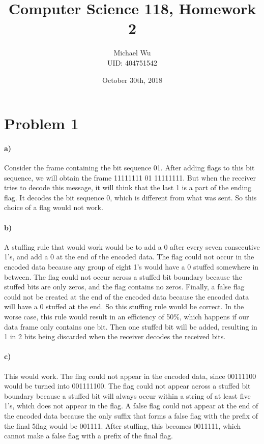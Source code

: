 \documentclass[12pt]{article}
\begin{document}
\title{Computer Science 118, Homework 2}
\date{October 30th, 2018}
\author{Michael Wu\\UID: 404751542}
\maketitle

\section*{Problem 1}

\paragraph{a)}

Consider the frame containing the bit sequence 01. After adding flags to this bit sequence, we will obtain the frame 11111111 01 11111111. But when the receiver tries to
decode this message, it will think that the last 1 is a part of the ending flag. It decodes the bit sequence 0, which is different from what was sent. So this choice of a flag
would not work.

\paragraph{b)}

A stuffing rule that would work would be to add a 0 after every seven consecutive 1's, and add a 0 at the end of the encoded data. The flag could not occur in the encoded data because
any group of eight 1's would have a 0 stuffed somewhere in between. The flag could not occur across a stuffed bit boundary because the stuffed bits are only zeros, and the flag contains no
zeros. Finally, a false flag could not be created at the end of the encoded data because the encoded data will have a 0 stuffed at the end. So this stuffing rule would be correct. In the worse
case, this rule would result in an efficiency of 50\%, which happens if our data frame only contains one bit. Then one stuffed bit will be added, resulting in 1 in 2 bits being discarded when the receiver
decodes the received bits.

\paragraph{c)}

This would work. The flag could not appear in the encoded data, since 00111100 would be turned into 001111100. The flag could not appear across a stuffed bit boundary because a stuffed bit will always occur
within a string of at least five 1's, which does not appear in the flag. A false flag could not appear at the end of the encoded data because the only suffix that forms a false flag with the prefix of the final 5flag
would be 001111. After stuffing, this becomes 0011111, which cannot make a false flag with a prefix of the final flag.
\end{document}
